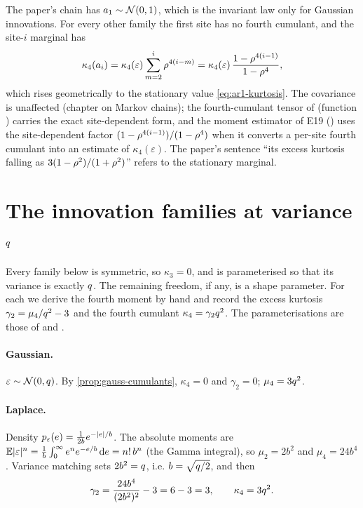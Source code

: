 \begin{remark}
The paper's chain has $a_1\sim\mathcal{N}\!\left(0,1\right)$, which is the invariant law only for
Gaussian innovations. For every other family the first site has no fourth cumulant,
and the site-$i$ marginal has
\[
  \kappa_4(a_i)=\kappa_4(\varepsilon)\sum_{m=2}^{i}\rho^{4(i-m)}
  =\kappa_4(\varepsilon)\,\frac{1-\rho^{4(i-1)}}{1-\rho^4},
\]
which rises geometrically to the stationary value \cref{eq:ar1-kurtosis}. The
covariance is unaffected (chapter on Markov chains); the fourth-cumulant tensor of
 (function ) carries the exact
site-dependent form, and the moment estimator of E19
() uses the site-dependent factor
$(1-\rho^{4(i-1)})/(1-\rho^4)$ when it converts a per-site fourth cumulant into an
estimate of $\kappa_4(\varepsilon)$. The paper's sentence
``its excess kurtosis falling as $3(1-\rho^2)/(1+\rho^2)$'' refers to the stationary
marginal.
\end{remark}

\section{The innovation families at variance $q$}
\label{sec:families}

Every family below is symmetric, so $\kappa_3=0$, and is parameterised so that its
variance is exactly $q$. The remaining freedom, if any, is a shape parameter. For
each we derive the fourth moment by hand and record the excess kurtosis
$\gamma_2=\mu_4/q^2-3$ and the fourth cumulant $\kappa_4=\gamma_2q^2$. The
parameterisations are those of  and
.

\paragraph{Gaussian.}
$\varepsilon\sim\mathcal{N}\!\left(0,q\right)$. By \cref{prop:gauss-cumulants}, $\kappa_4=0$ and
$\gamma_2=0$; $\mu_4=3q^2$.

\paragraph{Laplace.}
Density $p_{\varepsilon}(e)=\tfrac{1}{2b}e^{-|e|/b}$. The absolute moments are
$\mathbb{E}|\varepsilon|^n=\tfrac1b\int_0^\infty e^ne^{-e/b}\,\mathrm{d} e=n!\,b^n$ (the Gamma integral),
so $\mu_2=2b^2$ and $\mu_4=24b^4$. Variance matching sets $2b^2=q$, i.e.
$b=\sqrt{q/2}$, and then
\begin{equation}
  \gamma_2=\frac{24b^4}{(2b^2)^2}-3=6-3=3,\qquad \kappa_4=3q^2.
\end{equation}

